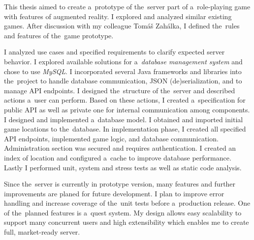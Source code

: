 This thesis aimed to create a~prototype of the~server part of a~role-playing game with features of augmented reality. I explored and analyzed similar existing games. After discussion with my colleague Tomáš Zahálka, I defined the~rules and features of the~game prototype. 

I analyzed use cases and specified requirements to clarify expected server behavior. I explored available solutions for a~\textit{database management system} and chose to use \textit{MySQL}. I incorporated several Java frameworks and libraries into the~project to handle database communication, JSON (de)serialization, and to manage API endpoints. I designed the~structure of the~server and described actions a~user can perform. Based on these actions, I created a~specification for public API as well as private one for internal communication among components. I designed and implemented a~database model. I obtained and imported initial game locations to the~database. In implementation phase, I created all specified API endpoints, implemented game logic, and database communication. Administration section was secured and requires authentication. I created an index of location and configured a~cache to improve database performance. Lastly I performed unit, system  and stress tests as well as static code analysis.

Since the~server is currently in prototype version, many features and further improvements are planed for future development. I plan to improve error handling and increase coverage of the~unit tests before a~production release. One of the~planned features is a~quest system. My design allows easy scalability to support many concurrent users and high extensibility which enables me to create full, market-ready server.